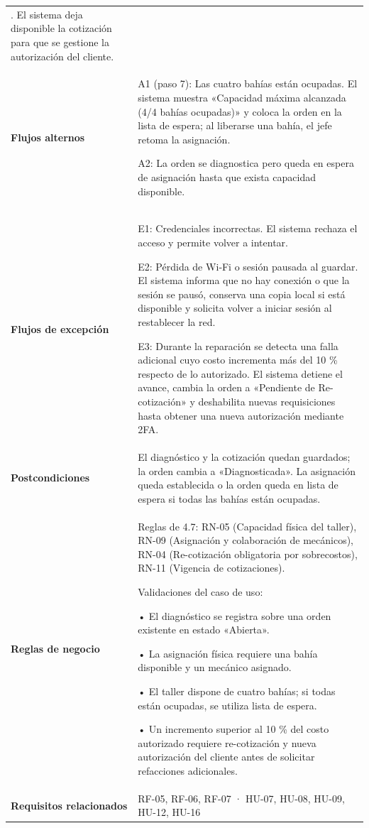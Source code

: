 {\begin{longtable}[]{@{}
  >{\raggedright\arraybackslash}p{}
  >{\raggedright\arraybackslash}p{}@{}}
10. El sistema deja disponible la cotización para que se gestione la
autorización del cliente. \\
\textbf{Flujos alternos} & A1 (paso 7): Las cuatro bahías están
ocupadas. El sistema muestra «Capacidad máxima alcanzada (4/4 bahías
ocupadas)» y coloca la orden en la lista de espera; al liberarse una
bahía, el jefe retoma la asignación.

A2: La orden se diagnostica pero queda en espera de asignación hasta que
exista capacidad disponible. \\
\textbf{Flujos de excepción} & E1: Credenciales incorrectas. El sistema
rechaza el acceso y permite volver a intentar.

E2: Pérdida de Wi‑Fi o sesión pausada al guardar. El sistema informa que
no hay conexión o que la sesión se pausó, conserva una copia local si
está disponible y solicita volver a iniciar sesión al restablecer la
red.

E3: Durante la reparación se detecta una falla adicional cuyo costo
incrementa más del 10 \% respecto de lo autorizado. El sistema detiene
el avance, cambia la orden a «Pendiente de Re-cotización» y deshabilita
nuevas requisiciones hasta obtener una nueva autorización mediante
2FA. \\
\textbf{Postcondiciones} & El diagnóstico y la cotización quedan
guardados; la orden cambia a «Diagnosticada». La asignación queda
establecida o la orden queda en lista de espera si todas las bahías
están ocupadas. \\
\textbf{Reglas de negocio} & Reglas de 4.7: RN-05 (Capacidad física del
taller), RN-09 (Asignación y colaboración de mecánicos), RN-04
(Re-cotización obligatoria por sobrecostos), RN-11 (Vigencia de
cotizaciones).

Validaciones del caso de uso:

• El diagnóstico se registra sobre una orden existente en estado
«Abierta».

• La asignación física requiere una bahía disponible y un mecánico
asignado.

• El taller dispone de cuatro bahías; si todas están ocupadas, se
utiliza lista de espera.

• Un incremento superior al 10 \% del costo autorizado requiere
re-cotización y nueva autorización del cliente antes de solicitar
refacciones adicionales. \\
\textbf{Requisitos relacionados} & RF-05, RF-06, RF-07 · HU-07, HU-08,
HU-09, HU-12, HU-16 \\
\end{longtable}
}

